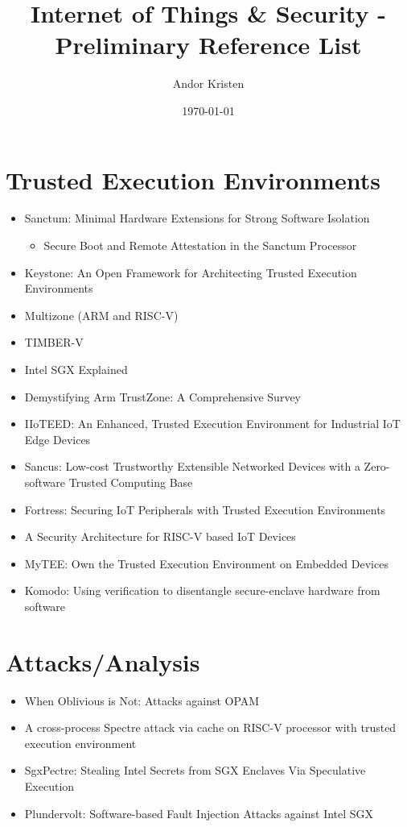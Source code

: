 \documentclass[10pt,a4paper]{article}
\title{Internet of Things \& Security - Preliminary Reference List}
\author{Andor Kristen}
\date{\today}
\begin{document}
\maketitle
\section{Trusted Execution Environments}
\begin{itemize}
    \item Sanctum: Minimal Hardware Extensions for Strong Software Isolation \cite{sanctum_paper}
    \begin{itemize}
        \item Secure Boot and Remote Attestation in the Sanctum
        Processor \cite{Lebedev2018}
    \end{itemize}
    \item Keystone: An Open Framework for Architecting Trusted Execution Environments \cite{keystone_paper}
    \item Multizone (ARM and RISC-V) \cite{multizone_arm, multizone_riscv}
    \item TIMBER-V \cite{timber-v}
    \item Intel SGX Explained \cite{intelsgx}
    \item Demystifying Arm TrustZone: A Comprehensive Survey \cite{trustzone_demist}
    \item IIoTEED: An Enhanced, Trusted Execution Environment for Industrial IoT Edge Devices %
    \item Sancus: Low-cost Trustworthy Extensible Networked Devices with a Zero-software Trusted Computing Base \cite{sancus}
    \item Fortress: Securing IoT Peripherals with Trusted Execution Environments \cite{fortress}
    \item A Security Architecture for RISC-V based IoT Devices \cite{tee_fraunhofer}
    \item MyTEE: Own the Trusted Execution Environment on Embedded Devices \cite{MyTEE}
    \item Komodo: Using verification to disentangle secure-enclave hardware from software \cite{Komodo}
\end{itemize}

\section{Attacks/Analysis}
\begin{itemize}
    \item When Oblivious is Not: Attacks against OPAM \cite{Roy2020}
    \item A cross-process Spectre attack via cache on RISC-V processor with trusted execution environment \cite{spectre_riscv}
    \item SgxPectre: Stealing Intel Secrets from SGX Enclaves Via Speculative Execution \cite{sgxspectre}
    \item Plundervolt: Software-based Fault Injection Attacks against Intel SGX \cite{plundervolt}
\end{itemize}
\end{document}
